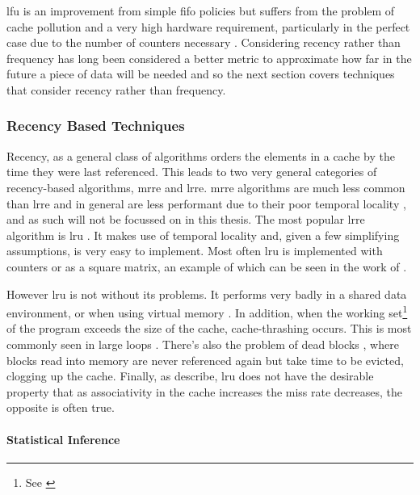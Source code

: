 \gls{lfu} is an improvement from simple \gls{fifo} policies but suffers from the problem of cache pollution and a very high hardware requirement, particularly in the perfect case due to the number of counters necessary \cite{podlipnigSurveyWebCache2003}. Considering recency rather than frequency has long been considered a better metric to approximate how far in the future a piece of data will be needed and so the next section covers techniques that consider recency rather than frequency. 

\subsubsection{Recency Based Techniques}
\label{sec:recency}

Recency, as a general class of algorithms orders the elements in a cache by the time they were last referenced. This leads to two very general categories of recency-based algorithms, \gls{mrre} and \gls{lrre}. \gls{mrre} algorithms are much less common than \gls{lrre} and in general are less performant due to their poor temporal locality \cite{pandaSurveyReplacementStrategies2016}, and as such will not be focussed on in this thesis. The most popular \gls{lrre} algorithm is \gls{lru} \cite{pitkowSimpleRobustCaching1994, karedlaCachingStrategiesImprove1994, smithCacheMemories1982}. It makes use of temporal locality and, given a few simplifying assumptions, is very easy to implement. Most often \gls{lru} is implemented with counters or as a square matrix, an example of which can be seen in the work of \citet{acklandSinglechip6billion16b2000}. 

However \gls{lru} is not without its problems. It performs very badly in a shared data environment, or when using virtual memory \cite{bansalCARClockAdaptive2004}. In addition, when the working set\footnote{See \cite{denningWorkingSetModel1968}} of the program exceeds the size of the cache, cache-thrashing \cite{denningThrashingItsCauses1968} occurs. This is most commonly seen in large loops \cite{linPredictingLastTouchReferences2002}. There's also the problem of dead blocks \cite{liuCacheBurstsNew2008}, where blocks read into memory are never referenced again but take time to be evicted, clogging up the cache. Finally, as \citet{linPredictingLastTouchReferences2002} describe, \gls{lru} does not have the desirable property that as associativity in the cache increases the miss rate decreases, the opposite is often true.

\paragraph{Statistical Inference}

